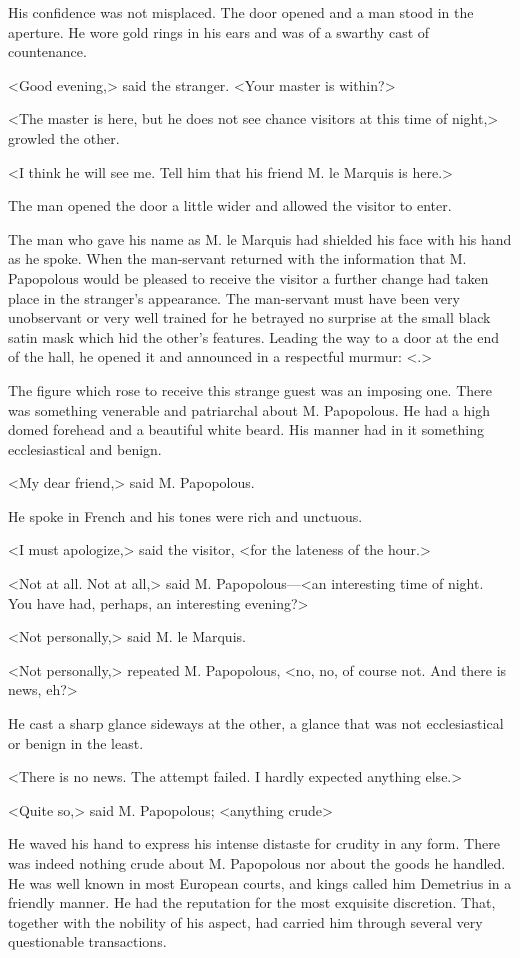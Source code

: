 His confidence was not misplaced. The door opened and a man stood in the aperture. He wore gold rings in his ears and was of a swarthy cast of countenance.

<Good evening,> said the stranger. <Your master is within?>

<The master is here, but he does not see chance visitors at this time of night,> growled the other.

<I think he will see me. Tell him that his friend M. le Marquis is here.>

The man opened the door a little wider and allowed the visitor to enter.

The man who gave his name as M. le Marquis had shielded his face with his hand as he spoke. When the man-servant returned with the information that M. Papopolous would be pleased to receive the visitor a further change had taken place in the stranger's appearance. The man-servant must have been very unobservant or very well trained for he betrayed no surprise at the small black satin mask which hid the other's features. Leading the way to a door at the end of the hall, he opened it and announced in a respectful murmur: <.>

The figure which rose to receive this strange guest was an imposing one. There was something venerable and patriarchal about M. Papopolous. He had a high domed forehead and a beautiful white beard. His manner had in it something ecclesiastical and benign.

<My dear friend,> said M. Papopolous.

He spoke in French and his tones were rich and unctuous.

<I must apologize,> said the visitor, <for the lateness of the hour.>

<Not at all. Not at all,> said M. Papopolous—<an interesting time of night. You have had, perhaps, an interesting evening?>

<Not personally,> said M. le Marquis.

<Not personally,> repeated M. Papopolous, <no, no, of course not. And there is news, eh?>

He cast a sharp glance sideways at the other, a glance that was not ecclesiastical or benign in the least.

<There is no news. The attempt failed. I hardly expected anything else.>

<Quite so,> said M. Papopolous; <anything crude\longdash>

He waved his hand to express his intense distaste for crudity in any form. There was indeed nothing crude about M. Papopolous nor about the goods he handled. He was well known in most European courts, and kings called him Demetrius in a friendly manner. He had the reputation for the most exquisite discretion. That, together with the nobility of his aspect, had carried him through several very questionable transactions.

